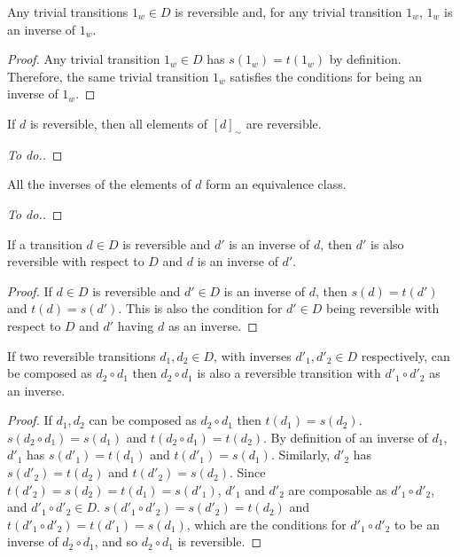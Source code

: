 \begin{proposition}
    Any trivial transitions $1_{w} \in D$ is reversible and, for any trivial transition $1_{w}$, $1_{w}$ is an inverse of $1_{w}$.
\end{proposition}\begin{proof}
    Any trivial transition $1_{w} \in D$ has $s(1_{w})=t(1_{w})$ by definition.
    Therefore, the same trivial transition $1_{w}$ satisfies the conditions for being an inverse of $1_{w}$.
\end{proof}

\begin{proposition}
    If $d$ is reversible, then all elements of $[d]_{\sim}$ are reversible.
\end{proposition}
\begin{proof}
    [To do.]
\end{proof}

\begin{proposition}
    All the inverses of the elements of $d$ form an equivalence class.
\end{proposition}
\begin{proof}
    [To do.]
\end{proof}

\begin{proposition}
    If a transition $d \in D$ is reversible and $d'$ is an inverse of $d$, then $d'$ is also reversible with respect to $D$ and $d$ is an inverse of $d'$.
    
\end{proposition}\begin{proof}
    If $d \in D$ is reversible and $d' \in D$ is an inverse of $d$, then $s(d)=t(d')$ and $t(d)=s(d')$.
    This is also the condition for $d' \in D$ being reversible with respect to $D$ and $d'$ having $d$ as an inverse.
\end{proof}

\begin{proposition}\label{prp:composed-reversible-transitions-are-reversible}
    If two reversible transitions $d_{1},d_{2} \in D$, with inverses $d'_{1},d'_{2} \in D$ respectively, can be composed as $d_{2} \circ d_{1}$ then $d_{2} \circ d_{1}$ is also a reversible transition with $d'_{1} \circ d'_{2}$ as an inverse.
\end{proposition}
\begin{proof}
    If $d_{1}, d_{2}$ can be composed as $d_{2} \circ d_{1}$ then $t(d_{1})=s(d_{2})$.
    $s(d_{2} \circ d_{1})=s(d_{1})$ and $t(d_{2} \circ d_{1})=t(d_{2})$.
    By definition of an inverse of $d_{1}$, $d'_{1}$ has $s(d'_{1})=t(d_{1})$ and $t(d'_{1})=s(d_{1})$.
    Similarly, $d'_{2}$ has $s(d'_{2})=t(d_{2})$ and $t(d'_{2})=s(d_{2})$.
    Since $t(d'_{2})=s(d_{2})=t(d_{1})=s(d'_{1})$, $d'_{1}$ and $d'_{2}$ are composable as $d'_{1} \circ d'_{2}$, and $d'_{1} \circ d'_{2} \in D$.
    $s(d'_{1} \circ d'_{2})=s(d'_{2})=t(d_{2})$ and $t(d'_{1} \circ d'_{2})=t(d'_{1})=s(d_{1})$, which are the conditions for $d'_{1} \circ d'_{2}$ to be an inverse of $d_{2} \circ d_{1}$, and so $d_{2} \circ d_{1}$ is reversible.
\end{proof}

